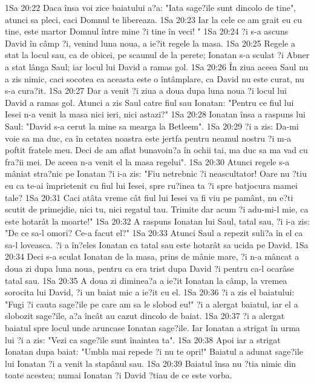 1Sa 20:22  Daca însa voi zice baiatului a?a: "Iata sage?ile sunt dincolo de tine", atunci sa pleci, caci Domnul te libereaza.
1Sa 20:23  Iar la cele ce am grait eu cu tine, este martor Domnul între mine ?i tine în veci! "
1Sa 20:24  ?i s-a ascuns David în câmp ?i, venind luna noua, a ie?it regele la masa.
1Sa 20:25  Regele a stat la locul sau, ca de obicei, pe scaunul de la perete; Ionatan s-a sculat ?i Abner a stat lânga Saul; iar locul lui David a ramas gol.
1Sa 20:26  În ziua aceea Saul nu a zis nimic, caci socotea ca aceasta este o întâmplare, ca David nu este curat, nu s-a cura?it.
1Sa 20:27  Dar a venit ?i ziua a doua dupa luna noua ?i locul lui David a ramas gol. Atunci a zis Saul catre fiul sau Ionatan: "Pentru ce fiul lui Iesei n-a venit la masa nici ieri, nici astazi?"
1Sa 20:28  Ionatan însa a raspuns lui Saul: "David s-a cerut la mine sa mearga la Betleem".
1Sa 20:29  ?i a zis: Da-mi voie sa ma duc, ca în cetatea noastra este jertfa pentru neamul nostru ?i m-a poftit fratele meu. Deci de am aflat bunavoin?a în ochii tai, ma duc sa ma vad cu fra?ii mei. De aceea n-a venit el la masa regelui".
1Sa 20:30  Atunci regele s-a mâniat stra?nic pe Ionatan ?i i-a zis: "Fiu netrebnic ?i neascultator! Oare nu ?tiu eu ca te-ai împrietenit cu fiul lui Iesei, spre ru?inea ta ?i spre batjocura mamei tale?
1Sa 20:31  Caci atâta vreme cât fiul lui Iesei va fi viu pe pamânt, nu e?ti scutit de primejdie, nici tu, nici regatul tau. Trimite dar acum ?i adu-mi-l mie, ca este hotarât la moarte!"
1Sa 20:32  A raspuns Ionatan lui Saul, tatal sau, ?i i-a zis: "De ce sa-l omori? Ce-a facut el?"
1Sa 20:33  Atunci Saul a repezit suli?a în el ca sa-l loveasca. ?i a în?eles Ionatan ca tatal sau este hotarât sa ucida pe David.
1Sa 20:34  Deci s-a sculat Ionatan de la masa, prins de mânie mare, ?i n-a mâncat a doua zi dupa luna noua, pentru ca era trist dupa David ?i pentru ca-l ocarâse tatal sau.
1Sa 20:35  A doua zi diminea?a a ie?it Ionatan la câmp, la vremea sorocita lui David, ?i un baiat mic a ie?it cu el.
1Sa 20:36  ?i a zis el baiatului: "Fugi ?i cauta sage?ile pe care am sa le slobod eu!" ?i a alergat baiatul, iar el a slobozit sage?ile, a?a încât au cazut dincolo de baiat.
1Sa 20:37  ?i a alergat baiatul spre locul unde aruncase Ionatan sage?ile. Iar Ionatan a strigat în urma lui ?i a zis: "Vezi ca sage?ile sunt înaintea ta".
1Sa 20:38  Apoi iar a strigat Ionatan dupa baiat: "Umbla mai repede ?i nu te opri!" Baiatul a adunat sage?ile lui Ionatan ?i a venit la stapânul sau.
1Sa 20:39  Baiatul însa nu ?tia nimic din toate acestea; numai Ionatan ?i David ?tiau de ce este vorba.
